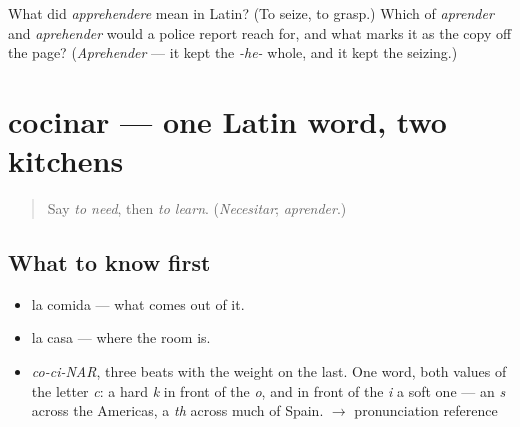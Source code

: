 \begin{tcolorbox}[breakable,colback=teal!4,colframe=teal!35!black,title={Before you move on}]
What did \emph{apprehendere} mean in Latin? (To seize, to grasp.) Which of \emph{aprender} and \emph{aprehender} would a police report reach for, and what marks it as the copy off the page? (\emph{Aprehender} — it kept the \emph{-he-} whole, and it kept the seizing.)
\end{tcolorbox}
\section[cocinar]{cocinar — one Latin word, two kitchens}

\label{lesson:ES-C396-cocinar}



\begin{quote}
Say \emph{to need}, then \emph{to learn}. (\emph{Necesitar}; \emph{aprender}.)
\end{quote}

\subsection*{What to know first}
\begin{itemize}
\raggedright
  \item la comida — what comes out of it.
  \item la casa — where the room is.
\end{itemize}

\begin{sounds}
\begin{itemize}
\raggedright
  \item \emph{co-ci-NAR}, three beats with the weight on the last. One word, both values of the letter \emph{c}: a hard \emph{k} in front of the \emph{o}, and in front of the \emph{i} a soft one — an \emph{s} across the Americas, a \emph{th} across much of Spain. $\to$ pronunciation reference
\end{itemize}
\end{sounds}

